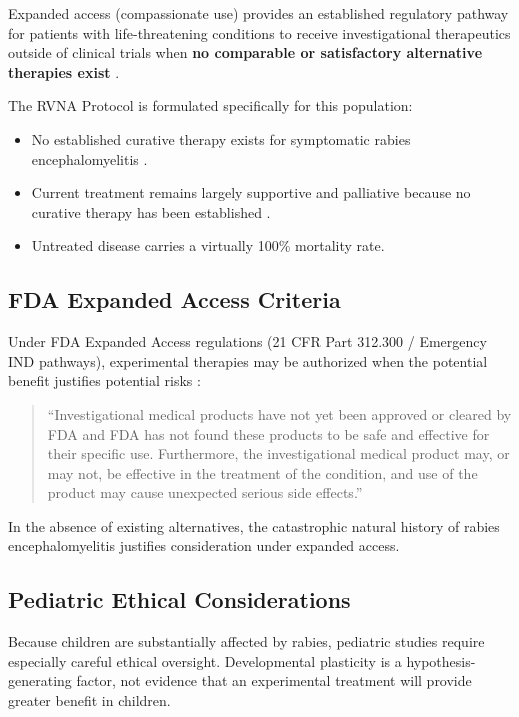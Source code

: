 \documentclass[12pt,a4paper]{article}
\begin{document}
Expanded access (compassionate use) provides an established regulatory pathway for patients with life-threatening conditions to receive investigational therapeutics outside of clinical trials when \textbf{no comparable or satisfactory alternative therapies exist} \citep{fda2026expanded}.

The RVNA Protocol is formulated specifically for this population:
\begin{itemize}
    \item No established curative therapy exists for symptomatic rabies encephalomyelitis \citep{jackson2011therapy}.
    \item Current treatment remains largely supportive and palliative because no curative therapy has been established \citep{lacy2024rabies}.
    \item Untreated disease carries a virtually 100\% mortality rate.
\end{itemize}

\subsection{FDA Expanded Access Criteria}

Under FDA Expanded Access regulations (21 CFR Part 312.300 / Emergency IND pathways), experimental therapies may be authorized when the potential benefit justifies potential risks \citep{fda2026expanded}:
\begin{quote}
``Investigational medical products have not yet been approved or cleared by FDA and FDA has not found these products to be safe and effective for their specific use. Furthermore, the investigational medical product may, or may not, be effective in the treatment of the condition, and use of the product may cause unexpected serious side effects.'' \citep{fda2026expanded}
\end{quote}
In the absence of existing alternatives, the catastrophic natural history of rabies encephalomyelitis justifies consideration under expanded access.

\subsection{Pediatric Ethical Considerations}

Because children are substantially affected by rabies, pediatric studies require especially careful ethical oversight. Developmental plasticity is a hypothesis-generating factor, not evidence that an experimental treatment will provide greater benefit in children.
\end{document}
